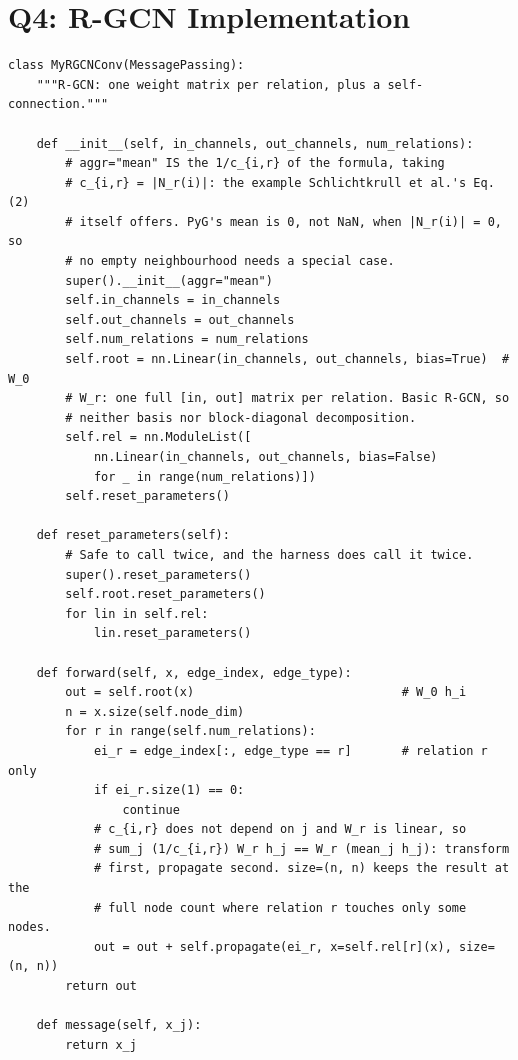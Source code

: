 \section{Q4: R-GCN Implementation}
\label{p2:sec:rgcn}



\begin{lstlisting}[style=pTwoPyStyle]
class MyRGCNConv(MessagePassing):
    """R-GCN: one weight matrix per relation, plus a self-connection."""

    def __init__(self, in_channels, out_channels, num_relations):
        # aggr="mean" IS the 1/c_{i,r} of the formula, taking
        # c_{i,r} = |N_r(i)|: the example Schlichtkrull et al.'s Eq. (2)
        # itself offers. PyG's mean is 0, not NaN, when |N_r(i)| = 0, so
        # no empty neighbourhood needs a special case.
        super().__init__(aggr="mean")
        self.in_channels = in_channels
        self.out_channels = out_channels
        self.num_relations = num_relations
        self.root = nn.Linear(in_channels, out_channels, bias=True)  # W_0
        # W_r: one full [in, out] matrix per relation. Basic R-GCN, so
        # neither basis nor block-diagonal decomposition.
        self.rel = nn.ModuleList([
            nn.Linear(in_channels, out_channels, bias=False)
            for _ in range(num_relations)])
        self.reset_parameters()

    def reset_parameters(self):
        # Safe to call twice, and the harness does call it twice.
        super().reset_parameters()
        self.root.reset_parameters()
        for lin in self.rel:
            lin.reset_parameters()

    def forward(self, x, edge_index, edge_type):
        out = self.root(x)                             # W_0 h_i
        n = x.size(self.node_dim)
        for r in range(self.num_relations):
            ei_r = edge_index[:, edge_type == r]       # relation r only
            if ei_r.size(1) == 0:
                continue
            # c_{i,r} does not depend on j and W_r is linear, so
            # sum_j (1/c_{i,r}) W_r h_j == W_r (mean_j h_j): transform
            # first, propagate second. size=(n, n) keeps the result at the
            # full node count where relation r touches only some nodes.
            out = out + self.propagate(ei_r, x=self.rel[r](x), size=(n, n))
        return out

    def message(self, x_j):
        return x_j
\end{lstlisting}

